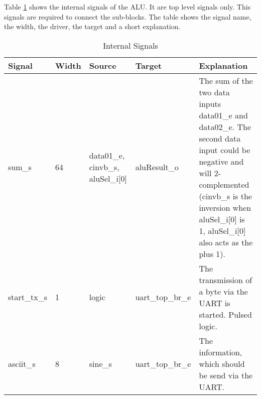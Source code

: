 Table \ref{tab:asAlu04} shows the internal signals of the ALU. It are top level signals only. This signals are required to connect the sub-blocks. The table shows the signal name, the width, the driver, the target and a short explanation.
\begin{table}[H]
\caption{Internal Signals}
\label{tab:asAlu04}
\centering
\begin{tabularx}{\textwidth}{|l |l |X |X |X|}
  \hline
  Signal & Width & Source & Target & Explanation \\
  \hline
  \hline
  sum\_s & 64 & data01\_e, cinvb\_s, aluSel\_i[0] & aluResult\_o & The sum of the two data inputs data01\_e and data02\_e. The second data input could be negative and will 2-complemented (cinvb\_s is the inversion when aluSel\_i[0] is 1, aluSel\_i[0] also acts as the plus 1).  \\
  \hline
  start\_tx\_s & 1 & logic & uart\_top\_br\_e & The transmission of a byte via the UART is started. Pulsed logic. \\
  \hline
  asciit\_s & 8 & sine\_s & uart\_top\_br\_e & The information, which should be send via the UART. \\
  \hline
\end{tabularx}
\end{table}
